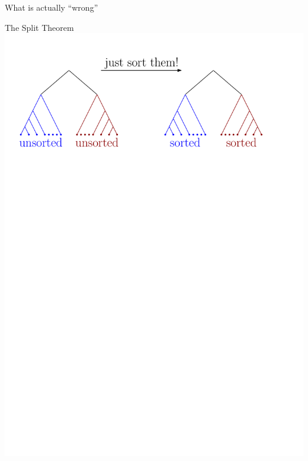 \documentclass{beamer}
\begin{document}
\begin{frame}{What is actually ``wrong''}
\begin{block}{The Split Theorem}
\centering
\includegraphics[width=0.9\framewidth]{merge_and_sort_trick}
\end{block}
\end{frame}
\end{document}
